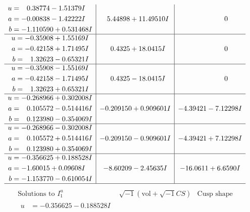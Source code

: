 \documentclass[1p]{elsarticle_modified}
\theoremstyle{definition}
\newcommand{\I}{\sqrt{-1}}
\begin{document}
$$\begin{array}{c|c|c}
\begin{aligned}
u &= \phantom{-}0.38774 - 1.51379 I \\
a &= -0.00838 - 1.42222 I \\
b &= -1.110590 + 0.531468 I\end{aligned}
 & \phantom{-}5.44898 + 11.49510 I & \phantom{-0.000000 } 0 \\ \hline\begin{aligned}
u &= -0.35908 + 1.55169 I \\
a &= -0.42158 + 1.71495 I \\
b &= \phantom{-}1.32623 - 0.65321 I\end{aligned}
 & \phantom{-}0.4325 + 18.0415 I & \phantom{-0.000000 } 0 \\ \hline\begin{aligned}
u &= -0.35908 - 1.55169 I \\
a &= -0.42158 - 1.71495 I \\
b &= \phantom{-}1.32623 + 0.65321 I\end{aligned}
 & \phantom{-}0.4325 - 18.0415 I & \phantom{-0.000000 } 0 \\ \hline\begin{aligned}
u &= -0.268966 + 0.302008 I \\
a &= \phantom{-}0.105572 - 0.514416 I \\
b &= \phantom{-}0.123980 - 0.354069 I\end{aligned}
 & -0.209150 + 0.909601 I & -4.39421 - 7.12298 I \\ \hline\begin{aligned}
u &= -0.268966 - 0.302008 I \\
a &= \phantom{-}0.105572 + 0.514416 I \\
b &= \phantom{-}0.123980 + 0.354069 I\end{aligned}
 & -0.209150 - 0.909601 I & -4.39421 + 7.12298 I \\ \hline\begin{aligned}
u &= -0.356625 + 0.188528 I \\
a &= -1.60015 + 0.09608 I \\
b &= -1.153770 - 0.610054 I\end{aligned}
 & -8.60209 - 2.45635 I & -16.0611 + 6.6590 I\\
 \hline 
 \end{array}$$\newpage$$\begin{array}{c|c|c}  
\text{Solutions to }I^u_{1}& \I (\text{vol} + \sqrt{-1}CS) & \text{Cusp shape}\\
 \hline 
\begin{aligned}
u &= -0.356625 - 0.188528 I \\

\end{aligned}
\end{array}$$
\end{document}
